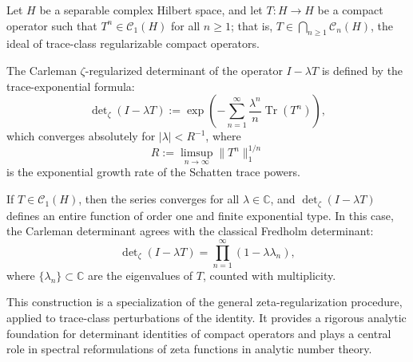 \begin{definition}
\label{def:carleman_zeta_determinant}
Let \( H \) be a separable complex Hilbert space, and let \( T \colon H \to H \) be a compact operator such that \( T^n \in \mathcal{C}_1(H) \) for all \( n \ge 1 \); that is, \( T \in \bigcap_{n \ge 1} \mathcal{C}_n(H) \), the ideal of trace-class regularizable compact operators.

\medskip
\noindent
The Carleman \(\zeta\)-regularized determinant of the operator \( I - \lambda T \) is defined by the trace-exponential formula:
\[
\det\nolimits_\zeta(I - \lambda T) := \exp\left( - \sum_{n=1}^\infty \frac{\lambda^n}{n} \operatorname{Tr}(T^n) \right),
\]
which converges absolutely for \( |\lambda| < R^{-1} \), where
\[
R := \limsup_{n \to \infty} \|T^n\|_1^{1/n}
\]
is the exponential growth rate of the Schatten trace powers.

\medskip
\noindent
If \( T \in \mathcal{C}_1(H) \), then the series converges for all \( \lambda \in \mathbb{C} \), and \( \det\nolimits_\zeta(I - \lambda T) \) defines an entire function of order one and finite exponential type. In this case, the Carleman determinant agrees with the classical Fredholm determinant:
\[
\det\nolimits_\zeta(I - \lambda T)
= \prod_{n=1}^\infty (1 - \lambda \lambda_n),
\]
where \( \{ \lambda_n \} \subset \mathbb{C} \) are the eigenvalues of \( T \), counted with multiplicity.

\medskip
\noindent
This construction is a specialization of the general zeta-regularization procedure, applied to trace-class perturbations of the identity. It provides a rigorous analytic foundation for determinant identities of compact operators and plays a central role in spectral reformulations of zeta functions in analytic number theory.
\end{definition}
% 